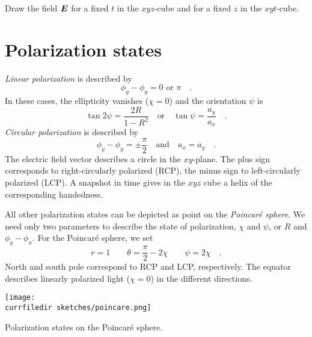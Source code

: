 \begin{questions}
    \item Draw the field $\boldsymbol{E}$ for a fixed $t$ in the $xyz$-cube and for a fixed $z$ in the $xyt$-cube.
\end{questions}


\section{Polarization states}

\emph{Linear polarization} is described by
\begin{equation}
    \phi_y - \phi_y = 0 \text{ or } \pi \quad .
\end{equation}
In these cases, the ellipticity vanishes ($\chi = 0$) and the orientation $\psi$ is 
\begin{equation}
    \tan 2 \psi = \frac{2R}{1 - R^2} \quad \text{or} \quad \tan \psi = \frac{a_y}{a_x} \quad .
\end{equation} 
%
\emph{Circular polarization} is described by
\begin{equation}
    \phi_y - \phi_y = \pm \frac{\pi}{2} \quad \text{and} \quad a_x = a_y \quad .
\end{equation}
The electric field vector describes a circle in the $xy$-plane. The plus sign corresponds to right-circularly polarized (RCP), the minus sign to left-circularly polarized (LCP). A snapshot in time gives in the $xyz$ cube a helix of the corresponding handedness.

All other polarization states can be depicted as point on the \emph{Poincaré sphere}. We need only two parameters to describe the state of polarization, $\chi$ and $\psi$, or $R$ and $\phi_y - \phi_x$. For the Poincaré sphere, we set 
\begin{equation}
    r = 1 \qquad \theta = \frac{\pi}{2} - 2 \chi \qquad \psi = 2 \chi \quad .
\end{equation}
North and south pole correspond to RCP and LCP, respectively. The equator describes linearly polarized light ($\chi =  0$) in the different directions.

\begin{marginfigure}
    \texttt{[image: \\currfiledir sketches/poincare.png]}
    \caption{Polarization states on the Poincaré sphere.}
\end{marginfigure}

